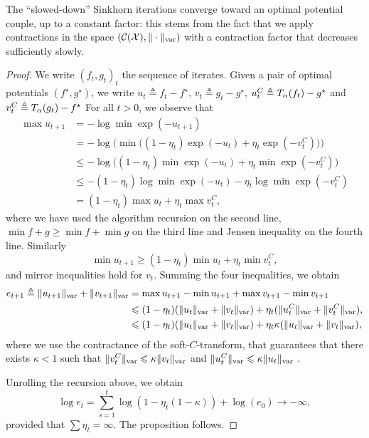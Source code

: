 The \enquote{slowed-down} Sinkhorn iterations converge toward an optimal
potential couple, up to a constant factor: this stems from the fact that we
apply contractions in the space $(\mathcal{C}(\mathcal{X}), \Vert\cdot\Vert_{\text{\upshape var}})$ with a
contraction factor that decreases sufficiently slowly.

\begin{proof}
    We write ${(f_t, g_t)}_t$ the sequence of iterates. Given a pair of optimal potentials 
    $(f^\star, g^\star)$, we write $u_t \triangleq f_t - f^\star$, $v_t \triangleq g_t - g^\star$,
    $u_t^C \triangleq T_{\alpha}(f_t) - g^\star$ and $v_t^C \triangleq T_{\alpha}(g_t) - f^\star$
    For all $t > 0$, we observe that 
    \begin{align}
        \max u_{t+1} &= - \log \min \exp(-u_{t+1}) \\
        &= - \log \big( \min \big( (1 - \eta_t) \exp(-u_{t}) + \eta_t 
        \exp(-v_t^C) \big) \big)\\
        &\leq - \log \big( (1 - \eta_t) \min \exp(-u_{t}) + \eta_t 
        \min \exp(-v_t^C) \big)\\
        &\leq - (1 - \eta_t) \log \min \exp(-u_{t}) -  \eta_t \log \min
         \exp(-v_t^C) \\
         &= (1 - \eta_t) \max u_t  + \eta_t \max v_t^C,
    \end{align}
    where we have used the algorithm recursion on the second line, $\min f + g \geq \min f + \min g$
     on the third line and Jensen inequality on the fourth line. Similarly
    \begin{equation}
        \min u_{t+1} \geq (1 - \eta_t) \min u_t  + \eta_t \min v_t^C,
    \end{equation}
    and mirror inequalities hold for $v_t$. Summing the four inequalities, we obtain
    \begin{align}\label{eq:et}
        e_{t+1} \triangleq \Vert u_{t+1} \Vert_{\text{\upshape var}} + \Vert v_{t+1} \Vert_{\text{\upshape var}} 
        &= \max u_{t+1} - \min u_{t+1} + \max v_{t+1} - \min v_{t+1} \\
        &\leqslant
        (1 - \eta_t) ( \Vert u_t \Vert_{\text{\upshape var}} + \Vert v_t \Vert_{\text{\upshape var}})
        + \eta_t ( \Vert u_t^C \Vert_{\text{\upshape var}} + \Vert v_t^C \Vert_{\text{\upshape var}}), \\
        &\leqslant
        (1 - \eta_t) ( \Vert u_t \Vert_{\text{\upshape var}} + \Vert v_t \Vert_{\text{\upshape var}})
        + \eta_t \kappa ( \Vert u_t \Vert_{\text{\upshape var}} + \Vert v_t \Vert_{\text{\upshape var}}),
    \end{align}
    where we use the contractance of the soft-$C$-transform, that guarantees that
    there exists $\kappa < 1$ such that $\Vert v_t^C\Vert_{\text{\upshape var}} \leqslant \kappa \Vert
    v_t\Vert_{\text{\upshape var}}$ and $\Vert u_t^C\Vert_{\text{\upshape var}} \leqslant \kappa \Vert
    u_t\Vert_{\text{\upshape var}}$ \citep{peyre2019computational}.

    Unrolling the recursion above, we obtain
    \begin{equation}
        \log e_t = \sum_{s=1}^t \log(1 - \eta_t (1 - \kappa)) + \log(e_0) \to - \infty,
    \end{equation}
    provided that $\sum \eta_t = \infty$. The proposition follows.
\end{proof}

